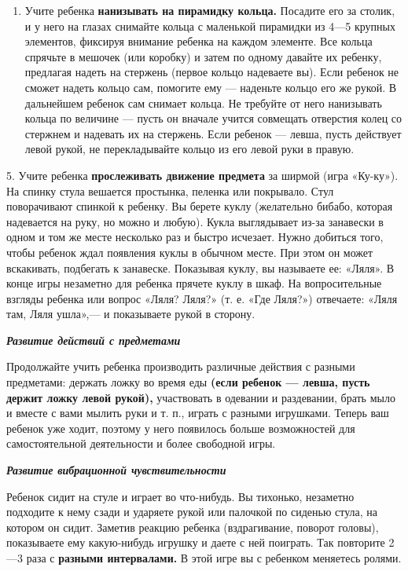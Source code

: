 \documentclass[a5paper]{book}
\renewcommand{\emph}[1]{\textit{#1}}
\begin{document}
\begin{enumerate}
\def\labelenumi{\arabic{enumi}.}
\setcounter{enumi}{2}
\item
  
  Учите ребенка \textbf{нанизывать на пирамидку кольца.} Посадите его за
  столик, и у него на глазах снимайте кольца с маленькой пирамидки из
  4---5 крупных элементов, фиксируя внимание ребенка на каждом элементе.
  Все кольца спрячьте в мешочек (или коробку) и затем по одному давайте
  их ребенку, предлагая надеть на стержень (первое кольцо надеваете вы).
  Если ребенок не сможет надеть кольцо сам, помогите ему --- наденьте
  кольцо его же рукой. В дальнейшем ребенок сам снимает кольца. Не
  требуйте от него нанизывать кольца по величине --- пусть он вначале
  учится совмещать отверстия колец со стержнем и надевать их на
  стержень. Если ребенок --- левша, пусть действует левой рукой, не
  перекладывайте кольцо из его левой руки в правую.
  
\end{enumerate}


5. Учите ребенка \textbf{прослеживать движение предмета} за ширмой (игра
«Ку-ку»). На спинку стула вешается простынка, пеленка или покрывало.
Стул поворачивают спинкой к ребенку. Вы берете куклу (желательно бибабо,
которая надевается на руку, но можно и любую). Кукла выглядывает из-за
занавески в одном и том же месте несколько раз и быстро исчезает. Нужно
добиться того, чтобы ребенок ждал появления куклы в обычном месте. При
этом он может вскакивать, подбегать к занавеске. Показывая куклу, вы
называете ее: «Ляля». В конце игры незаметно для ребенка прячете куклу в
шкаф. На вопросительные взгляды ребенка или вопрос «Ляля? Ляля?» (т. е.
«Где Ляля?») отвечаете: «Ляля там, Ляля ушла»,--- и показываете рукой в
сторону.

\emph{\textbf{Развитие действий с предметами}}

Продолжайте учить ребенка производить различные действия с разными
предметами: держать ложку во время еды \textbf{(если ребенок --- левша,
пусть держит ложку левой рукой),} участвовать в одевании и раздевании,
брать мыло и вместе с вами мылить руки и т. п., играть с разными
игрушками. Теперь ваш ребенок уже ходит, поэтому у него появилось больше
возможностей для самостоятельной деятельности и более свободной игры.

\emph{\textbf{Развитие вибрационной чувствительности}}

Ребенок сидит на стуле и играет во что-нибудь. Вы тихонько, незаметно
подходите к нему сзади и ударяете рукой или палочкой по сиденью стула,
на котором он сидит. Заметив реакцию ребенка (вздрагивание, поворот
головы), показываете ему какую-нибудь игрушку и даете с ней поиграть.
Так повторите 2---3 раза с \textbf{разными интервалами.} В этой игре вы
с ребенком меняетесь ролями.
\end{document}
